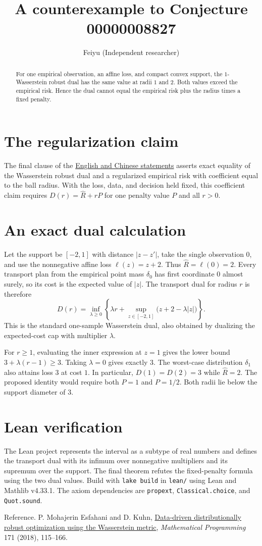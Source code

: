 \documentclass[11pt]{article}
\title{A counterexample to Conjecture 00000008827}
\author{Feiyu (Independent researcher)}
\date{}
\begin{document}
\maketitle

\begin{abstract}
For one empirical observation, an affine loss, and compact convex
support, the $1$-Wasserstein robust dual has the same value at radii
$1$ and $2$. Both values exceed the empirical risk. Hence the dual
cannot equal the empirical risk plus the radius times a fixed penalty.
\end{abstract}

\section*{The regularization claim}
The final clause of the \href{https://github.com/The-Last-Math-Competition/The-Last-Math-Competition/blob/main/conjectures/00000008827.md}{English and Chinese statements}
asserts exact equality of the Wasserstein robust dual and a regularized
empirical risk with coefficient equal to the ball radius. With the
loss, data, and decision held fixed, this coefficient claim requires
$D(r)=\widehat R+rP$ for one penalty value $P$ and all $r>0$.

\section*{An exact dual calculation}
Let the support be $[-2,1]$ with distance $|z-z'|$, take the single
observation $0$, and use the nonnegative affine loss $\ell(z)=z+2$.
Thus $\widehat R=\ell(0)=2$. Every transport plan from the empirical
point mass $\delta_0$ has first coordinate $0$ almost surely, so its
cost is the expected value of $|z|$. The transport dual for radius $r$
is therefore
\[
 D(r)=\inf_{\lambda\ge 0}
   \left\{\lambda r+\sup_{z\in[-2,1]}\bigl(z+2-\lambda|z|\bigr)\right\}.
\]
This is the standard one-sample Wasserstein dual, also obtained by
dualizing the expected-cost cap with multiplier $\lambda$.

For $r\ge 1$, evaluating the inner expression at $z=1$ gives the lower
bound $3+\lambda(r-1)\ge 3$. Taking $\lambda=0$ gives exactly $3$.
The worst-case distribution $\delta_1$ also attains loss $3$ at cost
$1$. In particular, $D(1)=D(2)=3$ while $\widehat R=2$. The proposed
identity would require both $P=1$ and $P=1/2$.
Both radii lie below the support diameter of $3$.

\section*{Lean verification}
The Lean project represents the interval as a subtype of real
numbers and defines the transport dual with its infimum over
nonnegative multipliers and its supremum over the support.
The final theorem refutes the fixed-penalty formula using the two
dual values. Build with \texttt{lake build} in \texttt{lean/} using
Lean and Mathlib v4.33.1. The axiom dependencies are
\texttt{propext}, \texttt{Classical.choice}, and \texttt{Quot.sound}.

\smallskip
\noindent
Reference. P. Mohajerin Esfahani and D. Kuhn,
\href{https://doi.org/10.1007/s10107-017-1172-1}{Data-driven distributionally robust optimization using the Wasserstein metric},
\emph{Mathematical Programming} 171 (2018), 115--166.
\end{document}
